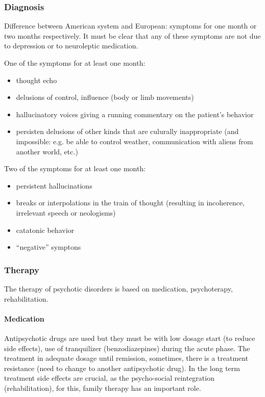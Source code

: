 \documentclass[12pt,article,oneside,a4paper]{memoir}
\begin{document}
\subsubsection{Diagnosis}
Difference between American system and European: symptoms for one month or two
months respectively. It must be clear that any of these symptoms are not due to
depression or to neuroleptic medication.

One of the symptoms for at least one month:
\begin{itemize}
\item thought echo
\item delusions of control, influence (body or limb movements)
\item hallucinatory voices giving a running commentary on the patient's
behavior
\item persisten delusions of other kinds that are culurally inappropriate
(and impossible: e.g. be able to control weather, communication with aliens
from  another world, etc.)
\end{itemize}

Two of the symptoms for at least one month:
\begin{itemize}
\item persistent hallucinations
\item breaks or interpolations in the train of thought (resulting in
incoherence, irrelevant speech or neologisms)
\item catatonic behavior
\item ``negative'' symptons
\end{itemize}

\subsubsection{Therapy}
The therapy of psychotic disorders is based on medication, psychoterapy,
rehabilitation.

\paragraph{Medication}
Antipsychotic drugs are used but they must be with low dosage start (to reduce
side effects), use of tranquilizer (benzodiazepines) during the acute phase.
The treatment in adequate dosage until remission, sometimes, there is a
treatment resistance (need to change to another antipsychotic drug).
In the long term treatment side effects are crucial, as the psycho-social
reintegration (rehabilitation), for this, family therapy has an important role.
\end{document}
